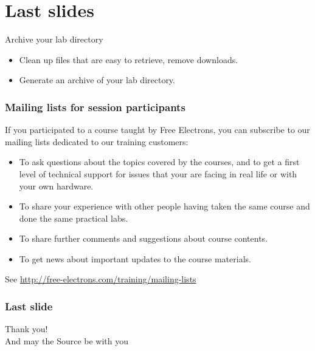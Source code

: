 \section{Last slides}

\setuplabframe
{Archive your lab directory}
{
  \begin{itemize}
  \item Clean up files that are easy to retrieve, remove downloads.
  \item Generate an archive of your lab directory.
  \end{itemize}
}

\begin{frame}
  \frametitle{Mailing lists for session participants}
  If you participated to a course taught by Free Electrons,
  you can subscribe to our mailing lists dedicated
  to our training customers:
  \begin{itemize}
  \item To ask questions about the topics covered by the courses,
        and to get a first level of technical support for issues
        that your are facing in real life or with your own hardware.
  \item To share your experience with other people having taken the same
        course and done the same practical labs.
  \item To share further comments and suggestions about course contents.
  \item To get news about important updates to the course materials. 
  \end{itemize}
  See \url{http://free-electrons.com/training/mailing-lists}
   
\end{frame}


\begin{frame}
  \frametitle{Last slide}
  \begin{center}
    \Huge
    Thank you!\\
    \huge
    And may the Source be with you\\
  \end{center}
\end{frame}
